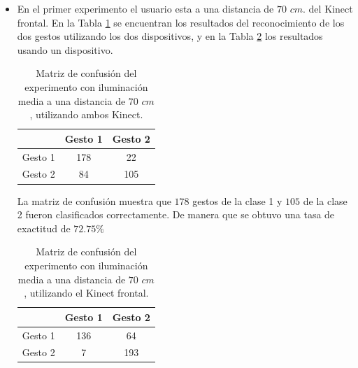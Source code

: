 
\begin{itemize}

\item En el primer experimento el usuario esta a una distancia de $70$ $cm.$ del Kinect frontal. En la Tabla \ref{table:70LMK2} se encuentran los resultados del reconocimiento de los dos gestos utilizando los dos dispositivos, y en la Tabla \ref{table:70LMK1} los resultados usando un dispositivo.  


\begin{table}[h!] 
\begin{center}
\caption{Matriz de confusión del experimento con iluminación media a una distancia de $70$ $cm$, utilizando ambos Kinect.}
\label{table:70LMK2}
\begin{tabular}{ r || c | c |}  
        & Gesto 1 & Gesto 2 \\ \hline \hline  
Gesto 1 & 178    &  22     \\ \hline  
Gesto 2 & 84     & 105     \\   
\end{tabular}
\end{center} 

\end{table}

La matriz de confusión muestra que $178$ gestos de la clase 1 y $105$ de la clase 2 fueron clasificados correctamente. De manera que se obtuvo una tasa de exactitud de $72.75 \%$ 

\begin{table}[h!] 
\begin{center} 
\caption{Matriz de confusión del experimento con iluminación media a una distancia de $70$ $cm$, utilizando el Kinect frontal.} 
\label{table:70LMK1}
\begin{tabular}{ r || c | c |} 
        & Gesto 1 & Gesto 2 \\ \hline \hline  
Gesto 1 & 136    &  64     \\ \hline  
Gesto 2 & 7     &  193     \\   
\end{tabular}
\end{center} 
\end{table} 


\end{itemize}
